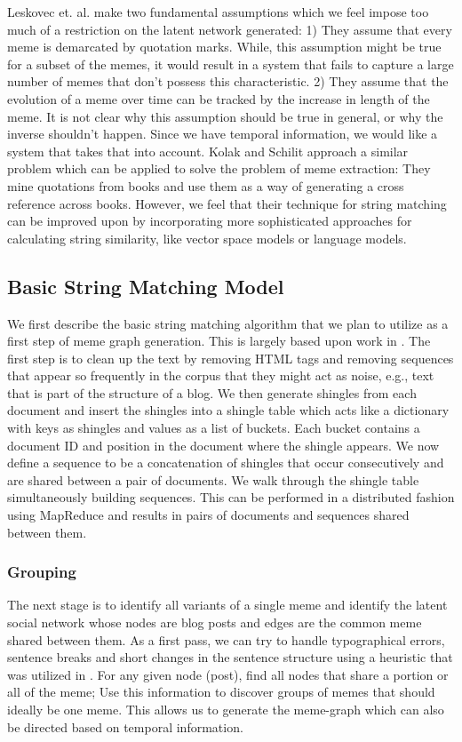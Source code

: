 \documentclass{acm_proc_article-sp}
\begin{document}
Leskovec et. al.\cite{leskovec2009meme} make two fundamental assumptions which we feel impose too much of a restriction on the latent network generated: 1) They assume that every meme is demarcated by quotation marks. While, this assumption might be true for a subset of the memes, it would result in a system that fails to capture a large number of memes that don't possess this characteristic. 2) They assume that the evolution of a meme over time can be tracked by the increase in length of the meme. It is not clear why this assumption should be true in general, or why the inverse shouldn't happen. Since we have temporal information, we would like a system that takes that into account. Kolak and Schilit \cite{kolak2008generating} approach a similar problem which can be applied to solve the problem of meme extraction: They mine quotations from books and use them as a way of generating a cross reference across books. However, we feel that their technique for string matching can be improved upon by incorporating more sophisticated approaches for calculating string similarity, like vector space models or language models.

\subsection{Basic String Matching Model}
We first describe the basic string matching algorithm that we plan to utilize as a first step of meme graph generation. This is largely based upon work in \cite{kolak2008generating}. The first step is to clean up the text by removing HTML tags and removing sequences that appear so frequently in the corpus that they might act as noise, e.g., text that is part of the structure of a blog. We then generate shingles from each document and insert the shingles into a shingle table which acts like a dictionary with keys as shingles and values as a list of buckets. Each bucket contains a document ID and position in the document where the shingle appears. We now define a sequence to be a concatenation of shingles that occur consecutively and are shared between a pair of documents. We walk through the shingle table simultaneously building sequences. This can be performed in a distributed fashion using MapReduce and results in pairs of documents and sequences shared between them. 



\subsubsection{Grouping}
The next stage is to identify all variants of a single meme and identify the latent social network whose nodes are blog posts and edges are the common meme shared between them. As a first pass, we can try to handle typographical errors, sentence breaks and short changes in the sentence structure using a heuristic that was utilized in \cite{kolak2008generating}. For any given node (post), find all nodes that share a portion or all of the meme; Use this information to discover groups of memes that should ideally be one meme. This allows us to generate the meme-graph which can also be directed based on temporal information.
\end{document}
